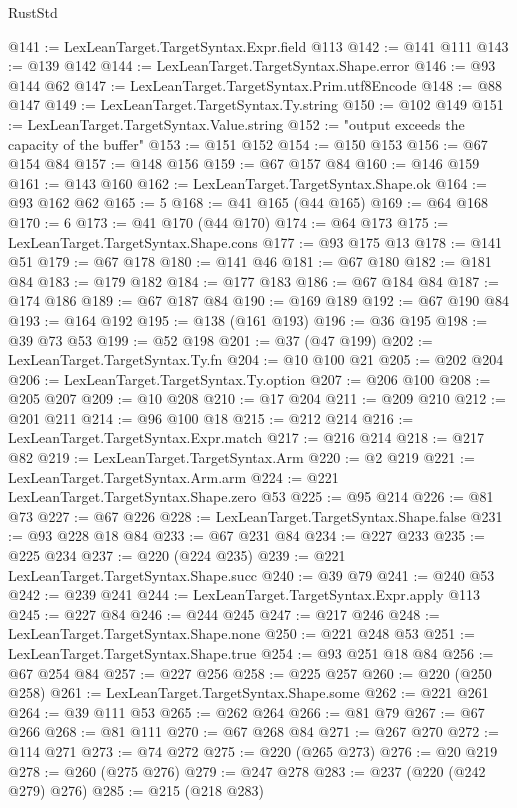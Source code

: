 \begin{lexlean}{RustStd}
\begin{coremodule}
@141 := LexLeanTarget.TargetSyntax.Expr.field @113
@142 := @141 @111
@143 := @139 @142
@144 := LexLeanTarget.TargetSyntax.Shape.error
@146 := @93 @144 @62
@147 := LexLeanTarget.TargetSyntax.Prim.utf8Encode
@148 := @88 @147
@149 := LexLeanTarget.TargetSyntax.Ty.string
@150 := @102 @149
@151 := LexLeanTarget.TargetSyntax.Value.string
@152 := "output exceeds the capacity of the buffer"
@153 := @151 @152
@154 := @150 @153
@156 := @67 @154 @84
@157 := @148 @156
@159 := @67 @157 @84
@160 := @146 @159
@161 := @143 @160
@162 := LexLeanTarget.TargetSyntax.Shape.ok
@164 := @93 @162 @62
@165 := 5
@168 := @41 @165 (@44 @165)
@169 := @64 @168
@170 := 6
@173 := @41 @170 (@44 @170)
@174 := @64 @173
@175 := LexLeanTarget.TargetSyntax.Shape.cons
@177 := @93 @175 @13
@178 := @141 @51
@179 := @67 @178
@180 := @141 @46
@181 := @67 @180
@182 := @181 @84
@183 := @179 @182
@184 := @177 @183
@186 := @67 @184 @84
@187 := @174 @186
@189 := @67 @187 @84
@190 := @169 @189
@192 := @67 @190 @84
@193 := @164 @192
@195 := @138 (@161 @193)
@196 := @36 @195
@198 := @39 @73 @53
@199 := @52 @198
@201 := @37 (@47 @199)
@202 := LexLeanTarget.TargetSyntax.Ty.fn
@204 := @10 @100 @21
@205 := @202 @204
@206 := LexLeanTarget.TargetSyntax.Ty.option
@207 := @206 @100
@208 := @205 @207
@209 := @10 @208
@210 := @17 @204
@211 := @209 @210
@212 := @201 @211
@214 := @96 @100 @18
@215 := @212 @214
@216 := LexLeanTarget.TargetSyntax.Expr.match
@217 := @216 @214
@218 := @217 @82
@219 := LexLeanTarget.TargetSyntax.Arm
@220 := @2 @219
@221 := LexLeanTarget.TargetSyntax.Arm.arm
@224 := @221 LexLeanTarget.TargetSyntax.Shape.zero @53
@225 := @95 @214
@226 := @81 @73
@227 := @67 @226
@228 := LexLeanTarget.TargetSyntax.Shape.false
@231 := @93 @228 @18 @84
@233 := @67 @231 @84
@234 := @227 @233
@235 := @225 @234
@237 := @220 (@224 @235)
@239 := @221 LexLeanTarget.TargetSyntax.Shape.succ
@240 := @39 @79
@241 := @240 @53
@242 := @239 @241
@244 := LexLeanTarget.TargetSyntax.Expr.apply @113
@245 := @227 @84
@246 := @244 @245
@247 := @217 @246
@248 := LexLeanTarget.TargetSyntax.Shape.none
@250 := @221 @248 @53
@251 := LexLeanTarget.TargetSyntax.Shape.true
@254 := @93 @251 @18 @84
@256 := @67 @254 @84
@257 := @227 @256
@258 := @225 @257
@260 := @220 (@250 @258)
@261 := LexLeanTarget.TargetSyntax.Shape.some
@262 := @221 @261
@264 := @39 @111 @53
@265 := @262 @264
@266 := @81 @79
@267 := @67 @266
@268 := @81 @111
@270 := @67 @268 @84
@271 := @267 @270
@272 := @114 @271
@273 := @74 @272
@275 := @220 (@265 @273)
@276 := @20 @219
@278 := @260 (@275 @276)
@279 := @247 @278
@283 := @237 (@220 (@242 @279) @276)
@285 := @215 (@218 @283)

\end{coremodule}
\end{lexlean}
